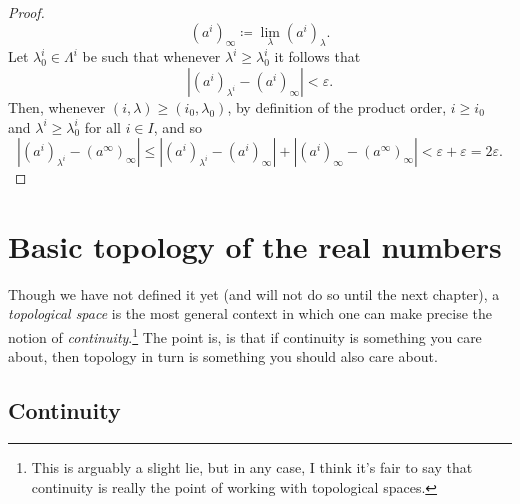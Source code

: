 \begin{prp}
\begin{proof}
\begin{equation}
(a^i)_\infty \coloneqq \lim _\lambda (a^i)_\lambda .
\end{equation}
Let $\lambda ^i_0\in \Lambda ^i$ be such that whenever $\lambda ^i\geq \lambda ^i_0$ it follows that
\begin{equation}
\left| (a^i)_{\lambda ^i}-(a^i)_\infty \right| <\varepsilon .
\end{equation}
Then, whenever $(i,\lambda )\geq (i_0,\lambda _0)$, by definition of the product order, $i\geq i_0$ and $\lambda ^i\geq \lambda ^i_0$ for all $i\in I$, and so
\begin{equation}
\left| (a^i)_{\lambda ^i}-(a^\infty )_\infty \right| \leq \left| (a^i)_{\lambda ^i}-(a^i)_\infty \right| +\left| (a^i)_\infty -(a^\infty )_\infty \right| <\varepsilon +\varepsilon =2\varepsilon .
\end{equation}
\end{proof}
\end{prp}

\section{Basic topology of the real numbers}

Though we have not defined it yet (and will not do so until the next chapter), a \emph{topological space} is the most general context in which one can make precise the notion of \emph{continuity}.\footnote{This is arguably a slight lie, but in any case, I think it's fair to say that continuity is really the point of working with topological spaces.}  The point is, is that if continuity is something you care about, then topology in turn is something you should also care about.

\subsection{Continuity}

